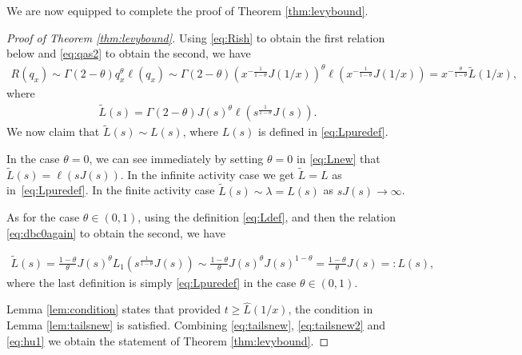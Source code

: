 \documentclass[a4,12pt]{amsart}
\numberwithin{equation}{section}
\begin{document}
We are now equipped to complete the proof of Theorem \ref{thm:levybound}.


\begin{proof}[Proof of Theorem \ref{thm:levybound}]

Using \eqref{eq:Rish} to obtain the first relation below and \eqref{eq:qas2} to obtain the second, we have 
\begin{align} \label{eq:hu1}
R(q_x) \sim \Gamma(2-\theta) q_x^\theta \ell(q_x) \sim  \Gamma(2-\theta) ( x^{-\frac{1}{1-\theta}} J(1/x))^\theta \ell\left( x^{-\frac{1}{1-\theta}} J(1/x) \right) = x^{ - \frac{\theta}{1-\theta}} \tilde{L}(1/x),
\end{align}
where 
\begin{align} \label{eq:Lnew}
\tilde{L}(s) = \Gamma(2-\theta)J(s)^\theta \ell \left( s^{\frac{1}{1-\theta}} J(s)\right).
\end{align}
We now claim that $\tilde{L}(s) \sim L(s)$, where $L(s)$ is defined in \eqref{eq:Lpuredef}. 

In the case $\theta = 0$, we can see immediately by setting $\theta = 0$ in \eqref{eq:Lnew} that $\tilde{L}(s) = \ell(sJ(s))$. 
In the infinite activity case we get $\tilde{L} = L$ as in~\eqref{eq:Lpuredef}. In the finite activity case 
$\tilde{L}(s) \sim \lambda =L(s)$ as $s J(s) \to \infty$.

As for the case $\theta \in (0,1)$, using the definition \eqref{eq:Ldef}, and then the relation \eqref{eq:dbc0again} to obtain the second, we have

\begin{align*}
\tilde{L}(s) = \frac{1-\theta}{\theta}J(s)^\theta L_1 \left( s^{\frac{1}{1-\theta}}J(s) \right) \sim \frac{1-\theta}{\theta}J(s)^\theta J(s)^{1-\theta} = \frac{1-\theta}{\theta}J(s) =:L(s),
\end{align*}
where the last definition is simply \eqref{eq:Lpuredef} in the case $\theta \in (0,1)$. 

Lemma \ref{lem:condition} states that provided $t \geq \hat{L}(1/x)$, the condition in Lemma \ref{lem:tailsnew} is satisfied. Combining \eqref{eq:tailsnew}, \eqref{eq:tailsnew2} and \eqref{eq:hu1} we obtain the statement of Theorem \ref{thm:levybound}.
\end{proof}


\color{black}
\end{document}
